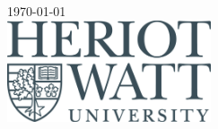 \documentclass[11pt, oneside]{Thesis} %
\begin{document}
\begin{titlepage}
\begin{center}
        {\large \today}\\[1cm] %
        \includegraphics[width=6cm]{./Figures/HWUlogo.jpg} %

        \vfill
    \end{center}

\end{titlepage}

\end{document}
